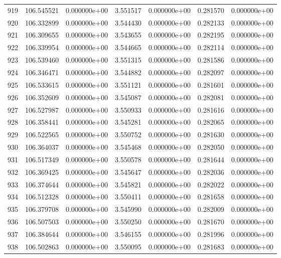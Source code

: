 \begin{tabular}{rrrrrrr}
 919 & 106.545521 &  0.000000e+00 &  3.551517 &  0.000000e+00 &    0.281570 &  0.000000e+00 \\
 920 & 106.332899 &  0.000000e+00 &  3.544430 &  0.000000e+00 &    0.282133 &  0.000000e+00 \\
 921 & 106.309655 &  0.000000e+00 &  3.543655 &  0.000000e+00 &    0.282195 &  0.000000e+00 \\
 922 & 106.339954 &  0.000000e+00 &  3.544665 &  0.000000e+00 &    0.282114 &  0.000000e+00 \\
 923 & 106.539460 &  0.000000e+00 &  3.551315 &  0.000000e+00 &    0.281586 &  0.000000e+00 \\
 924 & 106.346471 &  0.000000e+00 &  3.544882 &  0.000000e+00 &    0.282097 &  0.000000e+00 \\
 925 & 106.533615 &  0.000000e+00 &  3.551121 &  0.000000e+00 &    0.281601 &  0.000000e+00 \\
 926 & 106.352609 &  0.000000e+00 &  3.545087 &  0.000000e+00 &    0.282081 &  0.000000e+00 \\
 927 & 106.527987 &  0.000000e+00 &  3.550933 &  0.000000e+00 &    0.281616 &  0.000000e+00 \\
 928 & 106.358441 &  0.000000e+00 &  3.545281 &  0.000000e+00 &    0.282065 &  0.000000e+00 \\
 929 & 106.522565 &  0.000000e+00 &  3.550752 &  0.000000e+00 &    0.281630 &  0.000000e+00 \\
 930 & 106.364037 &  0.000000e+00 &  3.545468 &  0.000000e+00 &    0.282050 &  0.000000e+00 \\
 931 & 106.517349 &  0.000000e+00 &  3.550578 &  0.000000e+00 &    0.281644 &  0.000000e+00 \\
 932 & 106.369425 &  0.000000e+00 &  3.545647 &  0.000000e+00 &    0.282036 &  0.000000e+00 \\
 933 & 106.374644 &  0.000000e+00 &  3.545821 &  0.000000e+00 &    0.282022 &  0.000000e+00 \\
 934 & 106.512328 &  0.000000e+00 &  3.550411 &  0.000000e+00 &    0.281658 &  0.000000e+00 \\
 935 & 106.379708 &  0.000000e+00 &  3.545990 &  0.000000e+00 &    0.282009 &  0.000000e+00 \\
 936 & 106.507503 &  0.000000e+00 &  3.550250 &  0.000000e+00 &    0.281670 &  0.000000e+00 \\
 937 & 106.384644 &  0.000000e+00 &  3.546155 &  0.000000e+00 &    0.281996 &  0.000000e+00 \\
 938 & 106.502863 &  0.000000e+00 &  3.550095 &  0.000000e+00 &    0.281683 &  0.000000e+00 \\

\end{tabular}
